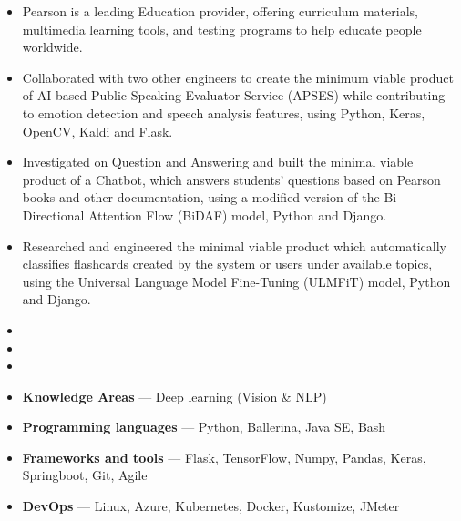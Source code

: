 \documentclass[10pt,a4paper,ragged2e,withhyper]{altacv}
\begin{document}
\begin{itemize}
    \item Pearson is a leading Education provider, offering curriculum materials, multimedia learning tools, and testing programs to help educate people worldwide.
    \item Collaborated with two other engineers to create the minimum viable product of AI-based Public Speaking Evaluator Service (APSES) while contributing to emotion detection and speech analysis features, using Python, Keras, OpenCV, Kaldi and Flask.
    \item Investigated on Question and Answering and built the minimal viable product of a Chatbot, which answers students' questions based on Pearson books and other documentation, using a modified version of the Bi-Directional Attention Flow (BiDAF) model, Python and Django.
    \item Researched and engineered the minimal viable product which automatically classifies flashcards created by the system or users under available topics, using the Universal Language Model Fine-Tuning (ULMFiT) model, Python and Django.
\end{itemize}

\medskip

{}

\begin{itemize}
    \item {}
    \item {}
    \item {}
\end{itemize}

\medskip


\begin{itemize}
    \item \textbf{Knowledge Areas } --- Deep learning (Vision \& NLP)
    \item \textbf{Programming languages} --- Python, Ballerina, Java SE, Bash
    \item \textbf{Frameworks and tools} --- Flask, TensorFlow, Numpy, Pandas, Keras, Springboot, Git, Agile
    \item \textbf{DevOps} --- Linux, Azure, Kubernetes, Docker, Kustomize, JMeter
\end{itemize}
\end{document}
